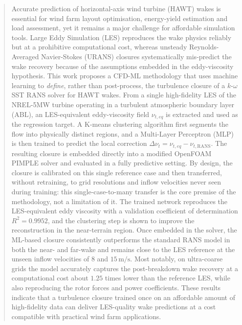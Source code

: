 \begin{abstract}
Accurate prediction of horizontal-axis wind turbine (HAWT) wakes is
essential for wind farm layout optimisation, energy-yield estimation and
load assessment, yet it remains a major challenge for affordable
simulation tools. Large Eddy Simulation (LES) reproduces the wake physics
reliably but at a prohibitive computational cost, whereas unsteady
Reynolds-Averaged Navier-Stokes (URANS) closures systematically
mis-predict the wake recovery because of the assumptions embedded in the
eddy-viscosity hypothesis. This work proposes a CFD-ML methodology that
uses machine learning to \emph{define}, rather than post-process, the
turbulence closure of a $k$-$\omega$ SST RANS solver for HAWT wakes.
From a single high-fidelity LES of the NREL-5MW turbine operating in a
turbulent atmospheric boundary layer (ABL), an LES-equivalent
eddy-viscosity field $\nu_{t,eq}$ is extracted and used as the regression
target. A K-means clustering algorithm first segments the flow into
physically distinct regions, and a Multi-Layer Perceptron (MLP) is then
trained to predict the local correction $\Delta\nu_t = \nu_{t,eq} -
\nu_{t,\mathrm{RANS}}$. The resulting closure is embedded directly into a
modified OpenFOAM PIMPLE solver and evaluated in a fully predictive
setting. By design, the closure is calibrated on this single reference
case and then transferred, without retraining, to grid resolutions and
inflow velocities never seen during training: this single-case-to-many
transfer is the core premise of the methodology, not a limitation of it.
The trained network reproduces the LES-equivalent eddy viscosity with a
validation coefficient of determination $R^2 = 0.9952$, and the
clustering step is shown to improve the reconstruction in the
near-terrain region. Once embedded in the solver, the ML-based closure
consistently outperforms the standard RANS model in both the near- and
far-wake and remains close to the LES reference at the unseen inflow
velocities of $8$ and $15\,\mathrm{m/s}$. Most notably, on ultra-coarse
grids the model accurately captures the post-breakdown wake recovery at a
computational cost about $1.25$ times lower than the reference LES, while
also reproducing the rotor forces and power coefficients. These results
indicate that a turbulence closure trained once on an affordable amount
of high-fidelity data can deliver LES-quality wake predictions at a cost
compatible with practical wind farm applications.
\end{abstract}

